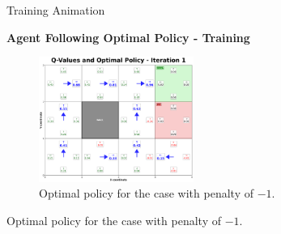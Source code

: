 \documentclass[aspectratio=169]{beamer}
\begin{document}
\begin{frame}{Training Animation}
    \begin{center}
        \textbf{Agent Following Optimal Policy - Training}
        \vspace{0.5cm}
        
        
            \begin{figure}[h]
                \centering
                \includegraphics[width=0.45\textwidth]{./Results/optimal_policy_reward_minus_1.png}
                \caption{Optimal policy for the case with penalty of $-1$.}
            \end{figure}
        

        
        \vspace{0.3cm}
        \small{
       Optimal policy for the case with penalty of $-1$.}
    \end{center}
\end{frame}
\end{document}
